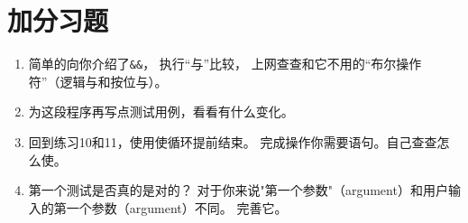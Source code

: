 
\section{加分习题}

\begin{enumerate}
\item 简单的向你介绍了\verb|&&|， 执行“与”比较， 上网查查和它不用的“布尔操作符”（逻辑与和按位与）。
\item 为这段程序再写点测试用例，看看有什么变化。
\item 回到练习10和11，使用使循环提前结束。 完成操作你需要语句。自己查查怎么使。
\item 第一个测试是否真的是对的？ 对于你来说"第一个参数"（argument）和用户输入的第一个参数（argument）不同。 完善它。
\end{enumerate}


